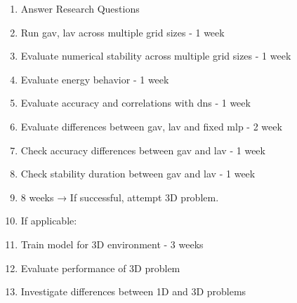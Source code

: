 \begin{enumerate}[label=\textbf{\color{titlecolor}\arabic*.}]
    \item[] Answer Research Questions

    \item Run \gls{gav}, \gls{lav} across multiple grid sizes - 1 week

    \item Evaluate numerical stability across multiple grid sizes - 1 week

    \item Evaluate energy behavior - 1 week

    \item Evaluate accuracy and correlations with \gls{dns} - 1 week

    \item Evaluate differences between \gls{gav}, \gls{lav} and fixed \gls{mlp} - 2 week

    \item Check accuracy differences between \gls{gav} and \gls{lav} - 1 week

    \item Check stability duration between \gls{gav} and \gls{lav} - 1 week

    \item[] 8 weeks → If successful, attempt 3D problem.

    \item[] If applicable:

    \item Train model for 3D environment - $3$ weeks

    \item Evaluate performance of 3D problem

    \item Investigate differences between 1D and 3D problems

\end{enumerate}
